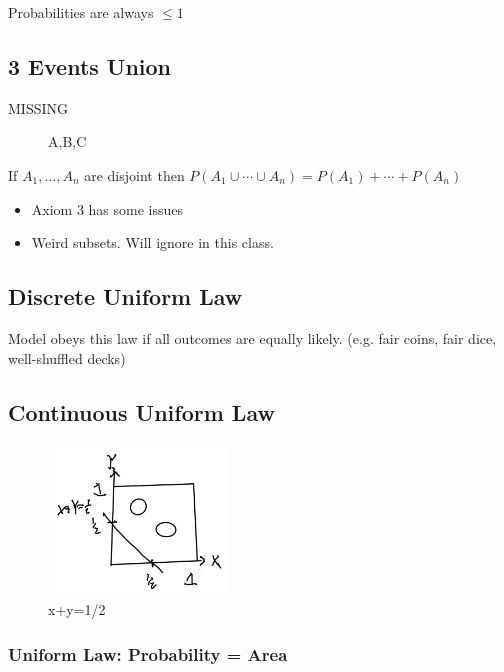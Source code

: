 Probabilities are always $\le 1$

\subsection{3 Events Union}

MISSING

\begin{figure}[!ht]
\centering
{}
\caption{A,B,C} \label{fig:M3}
\end{figure}

If $A_1,\ldots, A_n$ are disjoint then $P(A_1 \cup \cdots \cup A_n) = P(A_1) + \cdots + P(A_n)$

\begin{itemize}
    \item Axiom 3 has some issues 
    \item Weird subsets.  Will ignore in this class.
\end{itemize}

\subsection{Discrete Uniform Law}

Model obeys this law if all outcomes are equally likely. (e.g. fair coins, fair dice, well-shuffled decks)

\subsection{Continuous Uniform Law}

\begin{figure}[!ht]
\centering
\includegraphics[width=5cm, height=4cm]{images/L01/cont_unif_law.jpeg}
\caption{x+y=1/2}
\end{figure}

\subsubsection{Uniform Law: Probability = Area}


